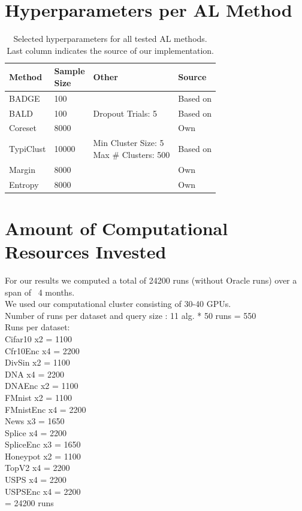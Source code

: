 \documentclass[]{article}
\begin{document}
\section{Hyperparameters per AL Method}\label{app:agent_hyperparameters}
\begin{table}[H]
    \caption{Selected hyperparameters for all tested AL methods. Last column indicates the source of our implementation.}
	\centering
	\begin{tabular}{l || l | l | l}
		Method & \makecell{Sample\\Size} & Other & Source\\
		\hline
		BADGE & 100 & & Based on \cite{ashdeep, curelab}\\
		BALD & 100 & Dropout Trials: 5 & Based on \cite{pycls} \\
		Coreset & 8000 & & Own \\
		TypiClust & 10000 & \makecell[tl]{Min Cluster Size: 5\\Max \# Clusters: 500} & Based on \cite{hacohen2022active} \\
		Margin & 8000 & & Own\\
		Entropy & 8000 &  & Own\\
	\end{tabular}
\end{table}




\section{Amount of Computational Resources Invested}\label{app:compute}
For our results we computed a total of 24200 runs (without Oracle runs) over a span of ~4 months. \\
We used our computational cluster consisting of 30-40 GPUs. \\ [1mm]
Number of runs per dataset and query size : 11 alg. * 50 runs = 550 \\ [1mm]
Runs per dataset: \\
 Cifar10   x2 = 1100\\
 Cfr10Enc  x4 = 2200\\
 DivSin    x2 = 1100\\
 DNA       x4 = 2200\\
 DNAEnc    x2 = 1100\\
 FMnist    x2 = 1100\\
 FMnistEnc x4 = 2200\\
 News      x3 = 1650\\
 Splice    x4 = 2200\\
 SpliceEnc x3 = 1650\\
 Honeypot  x2 = 1100\\
 TopV2     x4 = 2200\\
 USPS      x4 = 2200\\
 USPSEnc   x4 = 2200\\
 = 24200 runs
 
\end{document}

